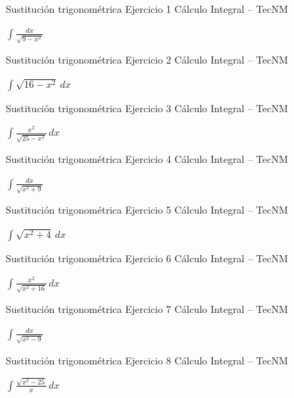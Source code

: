 \documentclass[aspectratio=169,12pt]{beamer}
\newcommand{\ejercicio}[1]{%
  \begin{center}
  \vfill
  {\fontsize{24}{30}\selectfont #1}
  \vfill
  \end{center}
}
\begin{document}
\begin{frame}{Sustitución trigonométrica}
\small Ejercicio 1 \hfill Cálculo Integral -- TecNM
\ejercicio{$\displaystyle \int \frac{dx}{\sqrt{9-x^2}}$}
\end{frame}
\begin{frame}{Sustitución trigonométrica}
\small Ejercicio 2 \hfill Cálculo Integral -- TecNM
\ejercicio{$\displaystyle \int \sqrt{16-x^2}\,dx$}
\end{frame}
\begin{frame}{Sustitución trigonométrica}
\small Ejercicio 3 \hfill Cálculo Integral -- TecNM
\ejercicio{$\displaystyle \int \frac{x^2}{\sqrt{25-x^2}}\,dx$}
\end{frame}
\begin{frame}{Sustitución trigonométrica}
\small Ejercicio 4 \hfill Cálculo Integral -- TecNM
\ejercicio{$\displaystyle \int \frac{dx}{\sqrt{x^2+9}}$}
\end{frame}
\begin{frame}{Sustitución trigonométrica}
\small Ejercicio 5 \hfill Cálculo Integral -- TecNM
\ejercicio{$\displaystyle \int \sqrt{x^2+4}\,dx$}
\end{frame}
\begin{frame}{Sustitución trigonométrica}
\small Ejercicio 6 \hfill Cálculo Integral -- TecNM
\ejercicio{$\displaystyle \int \frac{x^2}{\sqrt{x^2+16}}\,dx$}
\end{frame}
\begin{frame}{Sustitución trigonométrica}
\small Ejercicio 7 \hfill Cálculo Integral -- TecNM
\ejercicio{$\displaystyle \int \frac{dx}{\sqrt{x^2-9}}$}
\end{frame}
\begin{frame}{Sustitución trigonométrica}
\small Ejercicio 8 \hfill Cálculo Integral -- TecNM
\ejercicio{$\displaystyle \int \frac{\sqrt{x^2-25}}{x}\,dx$}
\end{frame}
\end{document}
